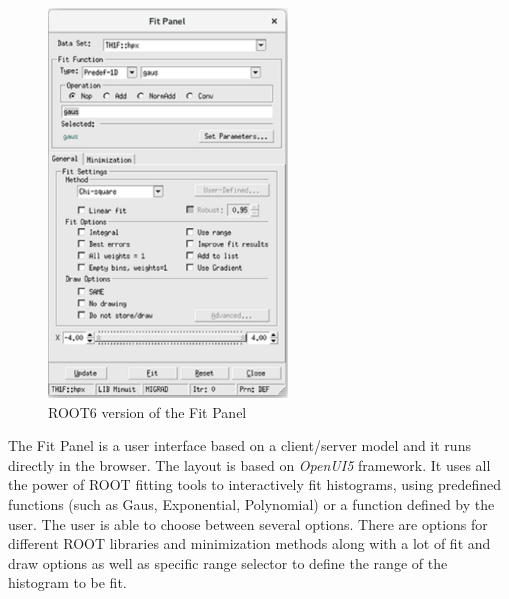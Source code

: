 \documentclass[a4paper]{jpconf}
\begin{document}
\begin{figure}[h]
\begin{minipage}{14pc}
\includegraphics[width=15pc]{oldPanel.eps}
\caption{\label{label}ROOT6 version of the Fit Panel}
\end{minipage}
\end{figure}

The Fit Panel is a user interface based on a client/server model and it runs directly
in the browser. The layout is based on \textit{OpenUI5} framework. It uses all the
power of ROOT fitting tools to interactively fit histograms, using predefined
functions (such as Gaus, Exponential, Polynomial) or a function defined by
the user. The user is able to choose between several options. There are options
for different ROOT libraries and minimization methods along with a lot of fit
and draw options as well as specific range selector to define the range of the
histogram to be fit.
\end{document}
